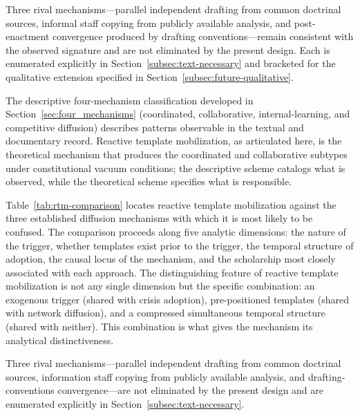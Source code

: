 Three rival mechanisms---parallel independent drafting from common doctrinal sources, informal staff copying from publicly available analysis, and post-enactment convergence produced by drafting conventions---remain consistent with the observed signature and are not eliminated by the present design. Each is enumerated explicitly in Section~\ref{subsec:text-necessary} and bracketed for the qualitative extension specified in Section~\ref{subsec:future-qualitative}.

The descriptive four-mechanism classification developed in Section~\ref{sec:four_mechanisms} (coordinated, collaborative, internal-learning, and competitive diffusion) describes patterns observable in the textual and documentary record. Reactive template mobilization, as articulated here, is the theoretical mechanism that produces the coordinated and collaborative subtypes under constitutional vacuum conditions; the descriptive scheme catalogs what is observed, while the theoretical scheme specifies what is responsible.

Table~\ref{tab:rtm-comparison} locates reactive template mobilization against the three established diffusion mechanisms with which it is most likely to be confused. The comparison proceeds along five analytic dimensions: the nature of the trigger, whether templates exist prior to the trigger, the temporal structure of adoption, the causal locus of the mechanism, and the scholarship most closely associated with each approach. The distinguishing feature of reactive template mobilization is not any single dimension but the specific combination: an exogenous trigger (shared with crisis adoption), pre-positioned templates (shared with network diffusion), and a compressed simultaneous temporal structure (shared with neither). This combination is what gives the mechanism its analytical distinctiveness.

Three rival mechanisms---parallel independent drafting from common doctrinal sources, information staff copying from publicly available analysis, and drafting-conventions convergence---are not eliminated by the present design and are enumerated explicitly in Section~\ref{subsec:text-necessary}.

